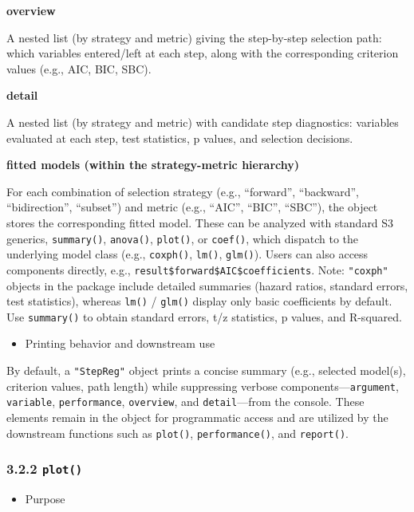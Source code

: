 \textbf{overview}

A nested list (by strategy and metric) giving the step-by-step selection path: which variables entered/left at each step, along with the corresponding criterion values (e.g., AIC, BIC, SBC).

\textbf{detail}

A nested list (by strategy and metric) with candidate step diagnostics: variables evaluated at each step, test statistics, p values, and selection decisions.

\textbf{fitted models (within the strategy-metric hierarchy)}

For each combination of selection strategy (e.g., ``forward'', ``backward'', ``bidirection'', ``subset'') and metric (e.g., ``AIC'', ``BIC'', ``SBC''), the object stores the corresponding fitted model. These can be analyzed with standard S3 generics, \texttt{summary()}, \texttt{anova()}, \texttt{plot()}, or \texttt{coef()}, which dispatch to the underlying model class (e.g., \texttt{coxph()}, \texttt{lm()}, \texttt{glm()}). Users can also access components directly, e.g., \texttt{result\$forward\$AIC\$coefficients}. Note: \texttt{"coxph"} objects in the  package include detailed summaries (hazard ratios, standard errors, test statistics), whereas \texttt{lm()} / \texttt{glm()} display only basic coefficients by default. Use \texttt{summary()} to obtain standard errors, t/z statistics, p values, and R-squared.

\begin{itemize}
\tightlist
\item
  Printing behavior and downstream use
\end{itemize}

By default, a \texttt{"StepReg"} object prints a concise summary (e.g., selected model(s), criterion values, path length) while suppressing verbose components---\texttt{argument}, \texttt{variable}, \texttt{performance}, \texttt{overview}, and \texttt{detail}---from the console. These elements remain in the object for programmatic access and are utilized by the downstream functions such as \texttt{plot()}, \texttt{performance()}, and \texttt{report()}.

\subsubsection{\texorpdfstring{3.2.2 \texttt{plot()}}{3.2.2 plot()}}\label{plot}

\begin{itemize}
\tightlist
\item
  Purpose
\end{itemize}

